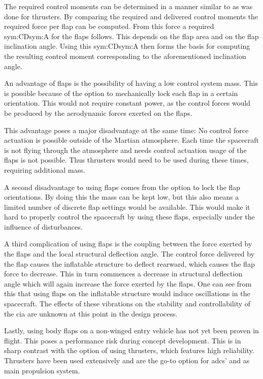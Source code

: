 The required control moments can be determined in a manner similar to as was done for thrusters. By comparing the required and delivered control moments the required force per flap can be computed. From this force a required \gls{sym:CD}\gls{sym:A} for the flaps follows. This depends on the flap area and on the flap inclination angle. Using this \gls{sym:CD}\gls{sym:A} then forms the basis for computing the resulting control moment corresponding to the aforementioned inclination angle.

An advantage of flaps is the possibility of having a low control system mass. This is possible because of the option to mechanically lock each flap in a certain orientation. This would not require constant power, as the control forces would be produced by the aerodynamic forces exerted on the flaps.

This advantage poses a major disadvantage at the same time: No control force actuation is possible outside of the Martian atmosphere. Each time the spacecraft is not flying through the atmosphere and needs control actuation usage of the flaps is not possible. Thus thrusters would need to be used during these times, requiring additional mass.

A second disadvantage to using flaps comes from the option to lock the flap orientations. By doing this the mass can be kept low, but this also means a limited number of discrete flap settings would be available. This would make it hard to properly control the spacecraft by using these flaps, especially under the influence of disturbances.

A third complication of using flaps is the coupling between the force exerted by the flaps and the local structural deflection angle. The control force delivered by the flap causes the inflatable structure to deflect rearward, which causes the flap force to decrease. This in turn commences a decrease in structural deflection angle which will again increase the force exerted by the flaps. One can see from this that using flaps on the inflatable structure would induce oscillations in the spacecraft. The effects of these vibrations on the stability and controllability of the \gls{cia} are unknown at this point in the design process.

Lastly, using body flaps on a non-winged entry vehicle has not yet been proven in flight. This poses a performance risk during concept development. This is in sharp contrast with the option of using thrusters, which features high reliability. Thrusters have been used extensively and are the go-to option for \gls{adcs}' and as main propulsion system.
